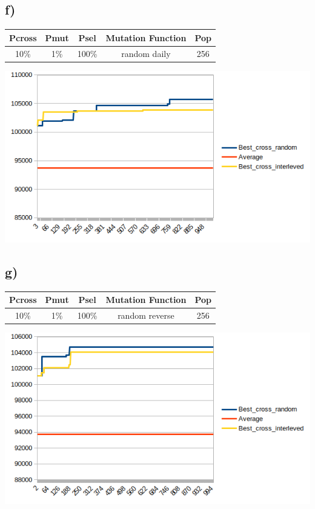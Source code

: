 \documentclass{article}
\begin{document}
\subsection*{f)}
\begin{table}[!htb]
\centering
\begin{tabular}{|c|c|c|c|c|}
\hline
\textbf{Pcross} & \textbf{Pmut} & \textbf{Psel} & \textbf{Mutation Function} & \textbf{Pop} \\ \hline
10\% & 1\% & 100\% & random daily & 256 \\ \hline
\end{tabular}
\end{table}
\includegraphics[scale=0.75]{16}

\subsection*{g)}
\begin{table}[!htb]
\centering
\begin{tabular}{|c|c|c|c|c|}
\hline
\textbf{Pcross} & \textbf{Pmut} & \textbf{Psel} & \textbf{Mutation Function} & \textbf{Pop} \\ \hline
10\% & 1\% & 100\% & random reverse & 256 \\ \hline
\end{tabular}
\end{table}

\includegraphics[scale=0.75]{17}
\end{document}
